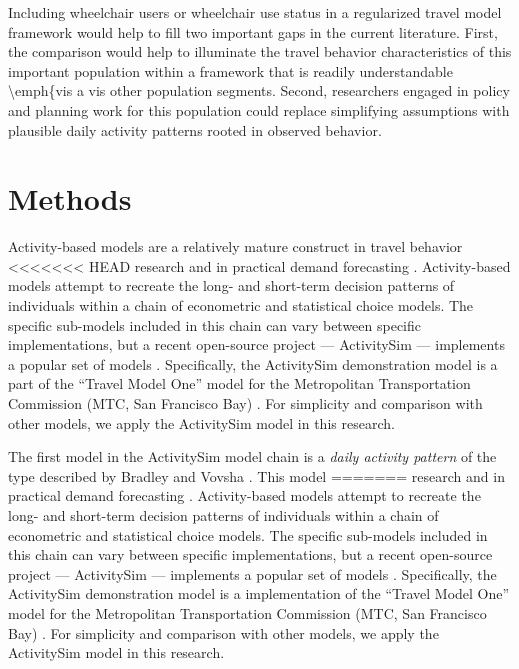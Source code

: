 \documentclass[3p, authoryear, review]{elsarticle} %
\begin{document}
Including wheelchair users or wheelchair use status in a regularized travel model
framework would help to fill two important gaps in the current literature. First,
the comparison would help to illuminate the travel behavior characteristics of
this important population within a framework that is readily understandable
\textbackslash emph\{vis a vis other population segments. Second, researchers engaged in
policy and planning work for this population could replace simplifying assumptions
with plausible daily activity patterns rooted in observed behavior.

\hypertarget{methodology}{%
\section{Methods}\label{methodology}}

Activity-based models are a relatively mature construct in travel behavior
<<<<<<< HEAD
research and in practical demand forecasting \citet{rasouli2014activity}. Activity-based models attempt
to recreate the long- and short-term decision patterns of individuals within a
chain of econometric and statistical choice models. The specific sub-models included
in this chain can vary between specific implementations, but a recent
open-source project --- ActivitySim \citet{activitysim} --- implements a popular
set of models \citet{davidson2010ct}. Specifically, the ActivitySim demonstration
model is a part of the ``Travel Model One'' model for the Metropolitan
Transportation Commission (MTC, San Francisco Bay) \citet{erhardt2012mtc}.
For simplicity and comparison with other models, we apply the ActivitySim model
in this research.

The first model in the ActivitySim model chain is a \emph{daily activity pattern}
of the type described by Bradley and Vovsha \citet{Bradley2005}. This model
=======
research and in practical demand forecasting \citep{rasouli2014activity}. Activity-based models attempt
to recreate the long- and short-term decision patterns of individuals within a
chain of econometric and statistical choice models. The specific sub-models included
in this chain can vary between specific implementations, but a recent
open-source project --- ActivitySim \citep{activitysim} --- implements a popular
set of models \citep{davidson2010ct}. Specifically, the ActivitySim demonstration
model is a implementation of the ``Travel Model One'' model for the Metropolitan
Transportation Commission (MTC, San Francisco Bay) \citep{erhardt2012mtc}.
For simplicity and comparison with other models, we apply the ActivitySim model
in this research.
\end{document}
